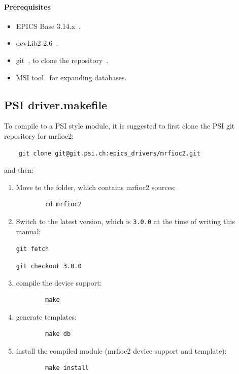 \documentclass[12pt,a4paper]{article}
\newcommand{\latestDriverVersion}{3.0.0}
\begin{document}
\paragraph{Prerequisites}
\begin{itemize}
\item 
	EPICS Base 3.14.x~\cite{epics}.
\item 
	devLib2 2.6~\cite{devlib2}.
\item
	git~\cite{git}, to clone the repository~\cite{git_mrfioc2}.
\item 
	MSI tool~\cite{msi} for expanding databases.
\end{itemize}

\subsection{PSI driver.makefile}\label{sec:PSI driver.makefile}
To compile to a PSI style module, it is suggested to first clone the PSI git repository for mrfioc2:
\begin{verbatim}
	git clone git@git.psi.ch:epics_drivers/mrfioc2.git
\end{verbatim}
and then:
\begin{enumerate}
\item
	Move to the folder, which contains mrfioc2 sources:
	\begin{verbatim}
		cd mrfioc2
	\end{verbatim}
	
\item 
	Switch to the latest version, which is \texttt{\latestDriverVersion} at the time of writing this manual:
	
	\texttt{git fetch}
	
	\texttt{git checkout \latestDriverVersion}
	
\item
	compile the device support:
	\begin{verbatim}
		make
	\end{verbatim}

\item 
	generate templates:
	\begin{verbatim}
		make db
	\end{verbatim}

\item 
	install the compiled module (mrfioc2 device support and template):
	\begin{verbatim}
		make install
	\end{verbatim}
\end{enumerate}
\end{document}
